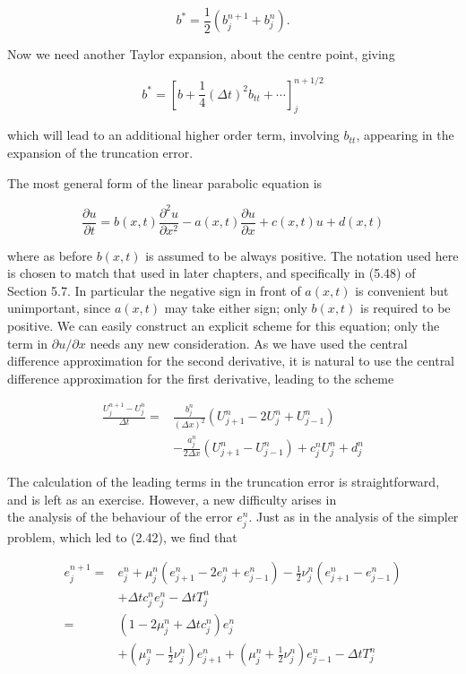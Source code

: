\documentclass[10pt]{article}
\begin{document}
\[
b^{*}=\frac{1}{2}\left(b_{j}^{n+1}+b_{j}^{n}\right) .
\]

Now we need another Taylor expansion, about the centre point, giving

\[
b^{*}=\left[b+\frac{1}{4}(\Delta t)^{2} b_{t t}+\cdots\right]_{j}^{n+1 / 2}
\]

which will lead to an additional higher order term, involving \(b_{t t}\), appearing in the expansion of the truncation error.

The most general form of the linear parabolic equation is

\[
\frac{\partial u}{\partial t}=b(x, t) \frac{\partial^{2} u}{\partial x^{2}}-a(x, t) \frac{\partial u}{\partial x}+c(x, t) u+d(x, t)
\]

where as before \(b(x, t)\) is assumed to be always positive. The notation used here is chosen to match that used in later chapters, and specifically in (5.48) of Section 5.7. In particular the negative sign in front of \(a(x, t)\) is convenient but unimportant, since \(a(x, t)\) may take either sign; only \(b(x, t)\) is required to be positive. We can easily construct an explicit scheme for this equation; only the term in \(\partial u / \partial x\) needs any new consideration. As we have used the central difference approximation for the second derivative, it is natural to use the central difference approximation for the first derivative, leading to the scheme

\[
\begin{aligned}
\frac{U_{j}^{n+1}-U_{j}^{n}}{\Delta t}= & \frac{b_{j}^{n}}{(\Delta x)^{2}}\left(U_{j+1}^{n}-2 U_{j}^{n}+U_{j-1}^{n}\right) \\
& -\frac{a_{j}^{n}}{2 \Delta x}\left(U_{j+1}^{n}-U_{j-1}^{n}\right)+c_{j}^{n} U_{j}^{n}+d_{j}^{n}
\end{aligned}
\]

The calculation of the leading terms in the truncation error is straightforward, and is left as an exercise. However, a new difficulty arises in\\
the analysis of the behaviour of the error \(e_{j}^{n}\). Just as in the analysis of the simpler problem, which led to (2.42), we find that

\[
\begin{aligned}
e_{j}^{n+1}= & e_{j}^{n}+\mu_{j}^{n}\left(e_{j+1}^{n}-2 e_{j}^{n}+e_{j-1}^{n}\right)-\frac{1}{2} \nu_{j}^{n}\left(e_{j+1}^{n}-e_{j-1}^{n}\right) \\
& +\Delta t c_{j}^{n} e_{j}^{n}-\Delta t T_{j}^{n} \\
= & \left(1-2 \mu_{j}^{n}+\Delta t c_{j}^{n}\right) e_{j}^{n} \\
& +\left(\mu_{j}^{n}-\frac{1}{2} \nu_{j}^{n}\right) e_{j+1}^{n}+\left(\mu_{j}^{n}+\frac{1}{2} \nu_{j}^{n}\right) e_{j-1}^{n}-\Delta t T_{j}^{n}
\end{aligned}
\]
\end{document}
